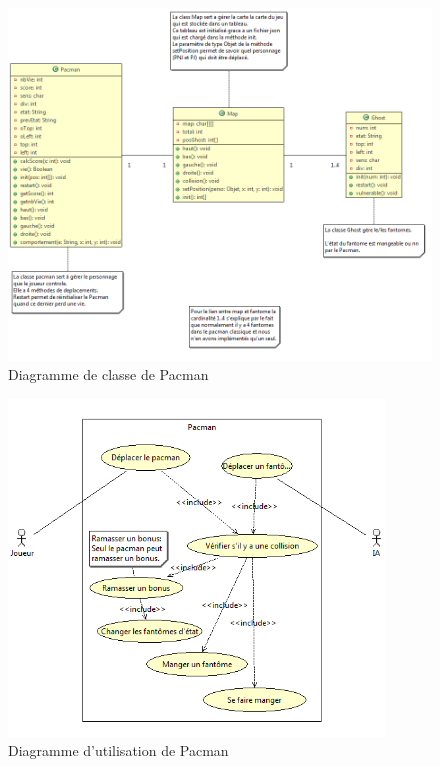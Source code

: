 
\listoffigures

\clearpage

\begin{figure}[h]
 \centering
 \includegraphics[width=\textwidth]{../umls/UML_images/Pacman/class} \hfill
 \caption{Diagramme de classe de Pacman}
\end{figure}

\begin{figure}[h]
 \centering
 \includegraphics[width=10cm]{../umls/UML_images/Pacman/utilisation}
 \caption{Diagramme d'utilisation de Pacman}
\end{figure}

